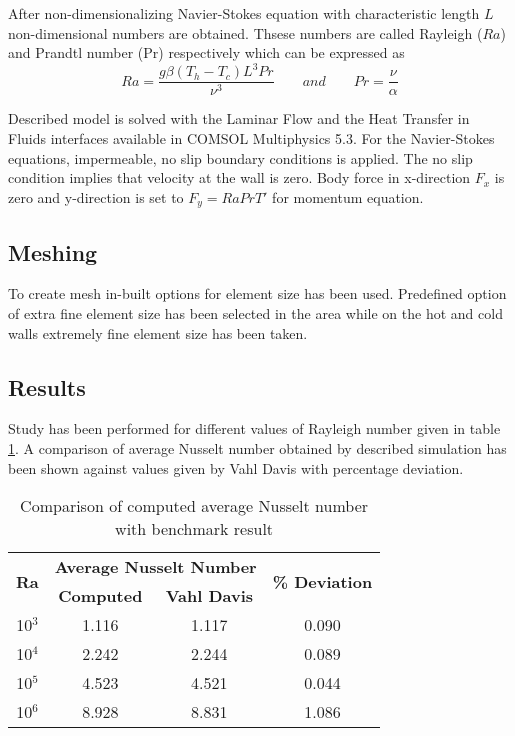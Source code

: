 After non-dimensionalizing Navier-Stokes equation with characteristic length $L$ non-dimensional numbers are obtained. Thsese numbers are called Rayleigh ($Ra$) and Prandtl number (Pr) respectively which can be expressed as
\begin{equation}
Ra = \frac{g\beta(T_h-T_c)L^3 Pr}{\nu^3} \qquad and \qquad Pr = \frac{\nu}{\alpha}
\end{equation}

Described model is solved with the Laminar Flow and the Heat Transfer in Fluids interfaces available in COMSOL Multiphysics 5.3. For the Navier-Stokes equations, impermeable, no slip boundary conditions is applied. The no slip condition implies that velocity at the wall is zero. Body force in x-direction $F_x$ is zero and y-direction  is set to $F_y = Ra Pr T'$ for momentum equation. 
\subsection{Meshing}
To create mesh in-built options for element size has been used. Predefined option of extra fine element size has been selected in the area while on the hot and cold walls extremely fine element size has been taken.
\subsection{Results}
Study has been performed for different values of Rayleigh number given in table \ref{nu}. A comparison of average Nusselt number obtained by described simulation has been shown against values given by Vahl Davis\citep{de1983natural} with percentage deviation.
\begin{table}[H]
\centering
\caption{Comparison of computed average Nusselt number with benchmark result}
\label{nu}
\begin{tabular}{|c|c|c|c|}
\hline
\multirow{2}{*}{\textbf{Ra}} & \multicolumn{2}{c|}{\textbf{Average Nusselt Number}}       & \multirow{2}{*}{\textbf{\% Deviation}} \\ \cline{2-3}
                             & \textbf{Computed} & \textbf{Vahl Davis} &                                        \\ \hline
10$^3$                     & 1.116             & 1.117               & 0.090                                  \\ \hline
10$^4$                     & 2.242             & 2.244               & 0.089                                  \\ \hline
10$^5$                     & 4.523             & 4.521               & 0.044                                  \\ \hline
10$^6$                     & 8.928             & 8.831               & 1.086                                  \\ \hline
\end{tabular}
\end{table}

